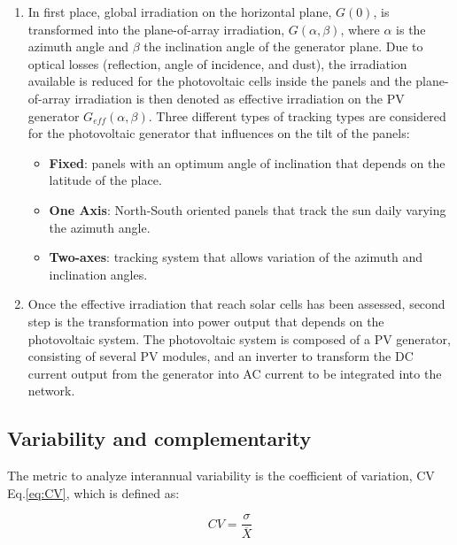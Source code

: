 \begin{enumerate}

\item In first place, global irradiation on the horizontal plane, $G(0)$, is transformed into the plane-of-array irradiation,  $G(\alpha, \beta)$, where $\alpha$ is the azimuth angle and $\beta$ the inclination angle of the generator plane. Due to optical losses (reflection, angle of incidence, and dust), the irradiation available is reduced for the photovoltaic cells inside the panels and the plane-of-array irradiation is then denoted as effective irradiation on the PV generator $G_{eff}(\alpha, \beta)$.
Three different types of tracking types are considered for the photovoltaic generator that influences on the tilt of the panels:
\begin{itemize}
\item \textbf{Fixed}: panels with an optimum angle of inclination that depends on the latitude of the place.
\item \textbf{One Axis}: North-South oriented panels that track the sun daily varying the azimuth angle.
\item \textbf{Two-axes}: tracking system that allows variation of the azimuth and inclination angles.
\end{itemize}
  
\item Once the effective irradiation that reach solar cells has been assessed, second step is the transformation into power output that depends on the photovoltaic system. The photovoltaic system is composed of a PV generator, consisting of several PV modules, and an inverter to transform the DC current output from the generator into AC current to be integrated into the network. %

\end{enumerate}

\subsection{Variability and complementarity}

The metric to analyze interannual variability is the coefficient of variation, CV Eq.\ref{eq:CV}, which is defined as:

\begin{equation}\label{eq:CV}
  CV=\frac{\sigma}{\overline{X}}
\end{equation}

